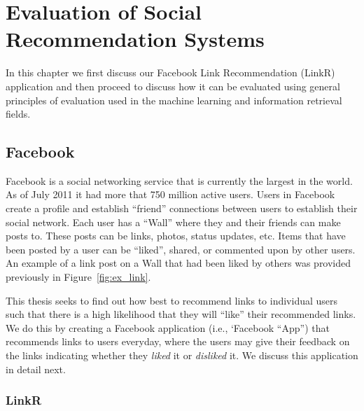 
\chapter{Evaluation of Social Recommendation Systems}

In this chapter we first discuss our Facebook Link Recommendation
(LinkR) application and then proceed to discuss how it can be
evaluated using general principles of evaluation used in the
machine learning and information retrieval fields.

\section{Facebook}

Facebook is a social networking service that is currently the largest
in the world. As of July 2011 it had more that 750 million active
users. Users in Facebook create a profile and establish ``friend''
connections between users to establish their social network. Each user
has a ``Wall'' where they and their friends can make posts to.  These
posts can be links, photos, status updates, etc.  Items that have been
posted by a user can be ``liked'', shared, or commented upon by other
users.  An example of a link post on a Wall that had been liked
by others was provided previously in Figure~\ref{fig:ex_link}.


This thesis seeks to find out how best to recommend links to
individual users such that there is a high likelihood that they will
``like'' their recommended links.  We do this by creating a
Facebook application (i.e., `Facebook ``App'') that recommends links
to users everyday, where the users may give their feedback on the
links indicating whether they \emph{liked} it or \emph{disliked} it.
We discuss this application in detail next.

\subsection{LinkR}

